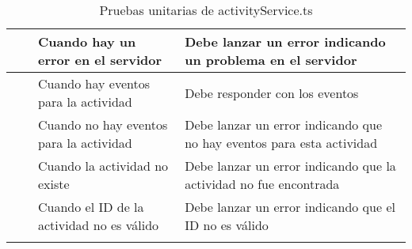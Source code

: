 \begin{small}
\begin{longtable}[H]{|>{\centering\arraybackslash}m{3cm}|>{\centering\arraybackslash}m{2cm}|>{\centering\arraybackslash}m{3cm}|>{\centering\arraybackslash}m{4cm}|}
		\cline{3-4}
		                                    &                             & Cuando hay un error en el servidor                          & Debe lanzar un error indicando un problema en el servidor             \\
		\hline
		\multirow{4}{4cm}{getEvents}        & \multirow{2}{3cm}{Positivo} & Cuando hay eventos para la actividad                        & Debe responder con los eventos                                        \\
		\cline{3-4}
		                                    &                             & Cuando no hay eventos para la actividad                     & Debe lanzar un error indicando que no hay eventos para esta actividad \\
		\cline{2-4}
		                                    & \multirow{2}{3cm}{Negativo} & Cuando la actividad no existe                               & Debe lanzar un error indicando que la actividad no fue encontrada     \\
		\cline{3-4}
		                                    &                             & Cuando el ID de la actividad no es válido                   & Debe lanzar un error indicando que el ID no es válido                 \\
		\hline
		\caption{Pruebas unitarias de activityService.ts}
	\end{longtable}
\end{small}

